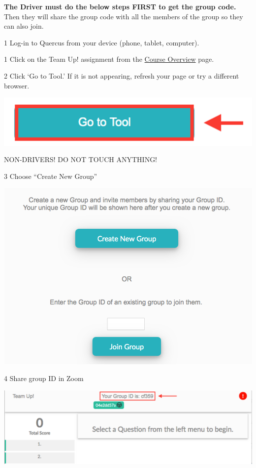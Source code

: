 \documentclass[
  openany]{book}
\begin{document}
\textbf{The Driver must do the below steps FIRST to get the group code.} Then they will share the group code with all the members of the group so they can also join.

1 Log-in to Quercus from your device (phone, tablet, computer).

1 Click on the Team Up! assignment from the \href{https://q.utoronto.ca/courses/253305/pages/course-overview}{Course Overview} page.

2 Click `Go to Tool.' If it is not appearing, refresh your page or try a different browser.

\begin{center}\includegraphics[width=0.5\linewidth]{images/course-tools/gototool} \end{center}

NON-DRIVERS! DO NOT TOUCH ANYTHING!

3 Choose ``Create New Group''

\begin{center}\includegraphics[width=1\linewidth]{images/course-tools/choose create} \end{center}

4 Share group ID in Zoom

\begin{center}\includegraphics[width=1\linewidth]{images/course-tools/group id} \end{center}
\end{document}
